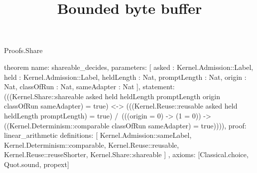 \begin{lexlean}{Proofs.Share}
\title{Bounded byte buffer}
\begin{semanticmodule}
theorem{
  name: shareable_decides,
  parameters: [
    asked : Kernel.Admission::Label,
    held : Kernel.Admission::Label,
    heldLength : Nat,
    promptLength : Nat,
    origin : Nat,
    classOfRun : Nat,
    sameAdapter : Nat
  ],
  statement: (((Kernel.Share::shareable asked held heldLength promptLength origin classOfRun sameAdapter) = true) <-> (((Kernel.Reuse::reusable asked held heldLength promptLength) = true) /\ (((origin = 0) -> (1 = 0)) -> ((Kernel.Determinism::comparable classOfRun sameAdapter) = true)))),
  proof: linear_arithmetic{
    definitions: [
      Kernel.Admission::sameLabel,
      Kernel.Determinism::comparable,
      Kernel.Reuse::reusable,
      Kernel.Reuse::reuseShorter,
      Kernel.Share::shareable
    ]
  },
  axioms: [Classical.choice, Quot.sound, propext]
}
\end{semanticmodule}
\end{lexlean}
